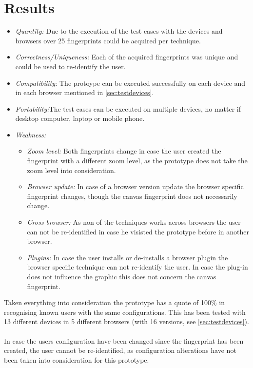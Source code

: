 \section{Results}
\begin{itemize}
	\item \textit{Quantity: }Due to the execution of the test cases with the devices and browsers over 25 fingerprints could be acquired per technique.
	\item \textit{Correctness/Uniqueness: }Each of the acquired fingerprints was unique and could be used to re-identify the user.
	\item \textit{Compatibility: }The protoype can be executed successfully on each device and in each browser mentioned in \autoref{sec:testdevices}. 
	\item \textit{Portability:}The test cases can be executed on multiple devices, no matter if desktop computer, laptop or mobile phone.
	\item \textit{Weakness: }
	\begin{itemize}
		\item \textit{Zoom level: }Both fingerprints change in case the user created the fingerprint with a different zoom level, as the prototype does not take the zoom level into consideration. 
		\item \textit{Browser update: }In case of a browser version update the browser specific fingerprint changes, though the canvas fingerprint does not necessarily change.
		\item \textit{Cross browser: }As non of the techniques works across browsers the user can not be re-identified in case he visisted the prototype before in another browser.
		\item \textit{Plugins: }In case the user installs or de-installs a browser plugin the browser specific technique can not re-identify the user. In case the plug-in does not influence the graphic this does not concern the canvas fingerprint.\\
	\end{itemize}
\end{itemize}
Taken everything into consideration the prototype has a quote of 100\% in recognising known users with the same configurations. This has been tested with 13 different devices in 5 different browsers (with 16 versions, see \autoref{sec:testdevices}).\\\\
In case the users configuration have been changed since the fingerprint has been created, the user cannot be re-identified, as configuration alterations have not been taken into consideration for this prototype.


